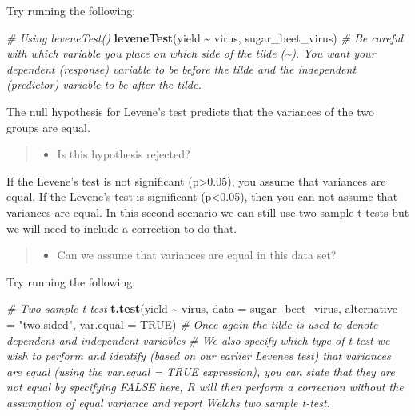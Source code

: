 \documentclass[
]{book}
\newenvironment{Shaded}{\begin{snugshade}}{\end{snugshade}}
\newcommand{\AttributeTok}[1]{\textcolor[rgb]{0.13,0.29,0.53}{#1}}
\newcommand{\CommentTok}[1]{\textcolor[rgb]{0.56,0.35,0.01}{\textit{#1}}}
\newcommand{\ConstantTok}[1]{\textcolor[rgb]{0.56,0.35,0.01}{#1}}
\newcommand{\FunctionTok}[1]{\textcolor[rgb]{0.13,0.29,0.53}{\textbf{#1}}}
\newcommand{\NormalTok}[1]{#1}
\newcommand{\SpecialCharTok}[1]{\textcolor[rgb]{0.81,0.36,0.00}{\textbf{#1}}}
\newcommand{\StringTok}[1]{\textcolor[rgb]{0.31,0.60,0.02}{#1}}
\providecommand{\tightlist}{%
  \setlength{\itemsep}{0pt}\setlength{\parskip}{0pt}}
\begin{document}
Try running the following;

\begin{Shaded}
\begin{Highlighting}[]
\CommentTok{\# Using leveneTest()}
\FunctionTok{leveneTest}\NormalTok{(yield }\SpecialCharTok{\textasciitilde{}}\NormalTok{ virus, sugar\_beet\_virus)}
\CommentTok{\# Be careful with which variable you place on which side of the tilde (\textasciitilde{}). You want your dependent (response) variable to be before the tilde and the independent (predictor) variable to be after the tilde.}
\end{Highlighting}
\end{Shaded}

The null hypothesis for Levene's test predicts that the variances of the two groups are equal.

\begin{quote}
\begin{itemize}
\tightlist
\item
  Is this hypothesis rejected?
\end{itemize}
\end{quote}

If the Levene's test is not significant (p\textgreater0.05), you assume that variances are equal. If the Levene's test is significant (p\textless0.05), then you can not assume that variances are equal. In this second scenario we can still use two sample t-tests but we will need to include a correction to do that.

\begin{quote}
\begin{itemize}
\tightlist
\item
  Can we assume that variances are equal in this data set?
\end{itemize}
\end{quote}

Try running the following;

\begin{Shaded}
\begin{Highlighting}[]
\CommentTok{\# Two sample t test}
\FunctionTok{t.test}\NormalTok{(yield }\SpecialCharTok{\textasciitilde{}}\NormalTok{ virus, }\AttributeTok{data =}\NormalTok{ sugar\_beet\_virus, }\AttributeTok{alternative =} \StringTok{"two.sided"}\NormalTok{, }\AttributeTok{var.equal =} \ConstantTok{TRUE}\NormalTok{)}
\CommentTok{\# Once again the tilde is used to denote dependent and independent variables}
\CommentTok{\# We also specify which type of t{-}test we wish to perform and identify (based on our earlier Levene\textquotesingle{}s test) that variances are equal (using the var.equal = TRUE expression), you can state that they are not equal by specifying FALSE here, R will then perform a correction without the assumption of equal variance and report Welch\textquotesingle{}s two sample t{-}test.}
\end{Highlighting}
\end{Shaded}
\end{document}
